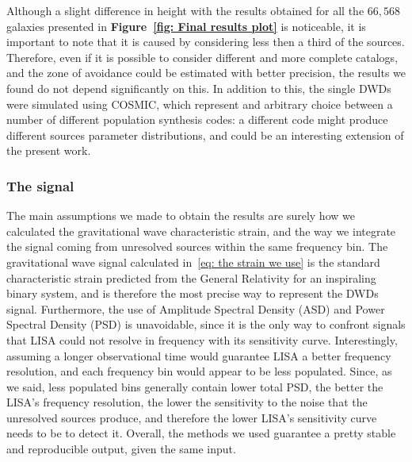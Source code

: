 Although a slight difference in height with the results obtained for all the $66,568$ galaxies presented in \textbf{Figure~\ref{fig: Final results plot}} is noticeable, it is important to note that it is caused by considering less then a third of the sources.
Therefore, even if it is possible to consider different and more complete catalogs, and the zone of avoidance could be estimated with better precision, the results we found do not depend significantly on this.
In addition to this, the single DWDs were simulated using COSMIC, which represent and arbitrary choice between a number of different population synthesis codes: a different code might produce different sources parameter distributions, and could be an interesting extension of the present work.

\subsubsection{The signal}
The main assumptions we made to obtain the results are surely how we calculated the gravitational wave characteristic strain, and the way we integrate the signal coming from unresolved sources within the same frequency bin.
The gravitational wave signal calculated in~\eqref{eq: the strain we use} is the standard characteristic strain predicted from the General Relativity for an inspiraling binary system, and is therefore the most precise way to represent the DWDs signal.
Furthermore, the use of Amplitude Spectral Density (ASD) and Power Spectral Density (PSD) is unavoidable, since it is the only way to confront signals that LISA could not resolve in frequency with its sensitivity curve.
Interestingly, assuming a longer observational time would guarantee LISA a better frequency resolution, and each frequency bin would appear to be less populated.
Since, as we said, less populated bins generally contain lower total PSD, the better the LISA's frequency resolution, the lower the sensitivity to the noise that the unresolved sources produce, and therefore the lower LISA's sensitivity curve needs to be to detect it.
Overall, the methods we used guarantee a pretty stable and reproducible output, given the same input.


